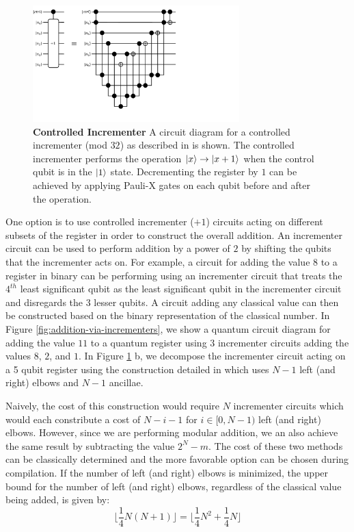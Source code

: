 \begin{figure}
    \centering
    \includegraphics[width=8cm]{figures/incrementer.pdf}
    \caption{
        \textbf{Controlled Incrementer} 
        A circuit diagram for a controlled incrementer (mod $32$) as described in \cite{Gidney_2015} is shown.
        The controlled incrementer performs the operation $\ket{x} \rightarrow \ket{x + 1}$ when the control qubit is in the $\ket{1}$ state.
        Decrementing the register by $1$ can be achieved by applying Pauli-X gates on each qubit before and after the operation.
    }
    \label{fig:incrementer}
\end{figure}


One option is to use controlled incrementer ($+1$) circuits acting on different subsets of the register in order to construct the overall addition.
An incrementer circuit can be used to perform addition by a power of $2$ by shifting the qubits that the incrementer acts on.
For example, a circuit for adding the value $8$ to a register in binary can be performing using an incrementer circuit that treats the $4^{th}$ least significant qubit as the least significant qubit in the incrementer circuit and disregards the $3$ lesser qubits.
A circuit adding any classical value can then be constructed based on the binary representation of the classical number.
In Figure \ref{fig:addition-via-incrementers}, we show a quantum circuit diagram for adding the value $11$ to a quantum register using $3$ incrementer circuits adding the values $8$, $2$, and $1$. 
In Figure \ref{fig:incrementer} b, we decompose the incrementer circuit acting on a 5 qubit register using the construction detailed in \cite{Gidney_2015} which uses $N - 1$ left (and right) elbows and $N - 1$ ancillae.

Naively, the cost of this construction would require $N$ incrementer circuits which would each constribute a cost of $N - i - 1$ for $i \in [0, N-1)$ left (and right) elbows.
However, since we are performing modular addition, we an also achieve the same result by subtracting the value $2^N - m$.
The cost of these two methods can be classically determined and the more favorable option can be chosen during compilation.
If the number of left (and right) elbows is minimized, the upper bound for the number of left (and right) elbows, regardless of the classical value being added, is given by:
\begin{equation}
    \lfloor \frac{1}{4} N (N + 1) \rfloor = \lfloor \frac{1}{4} N^2 + \frac{1}{4} N \rfloor
\end{equation} 


